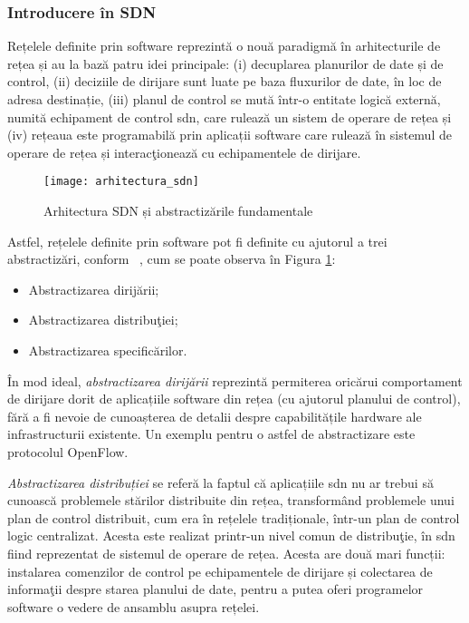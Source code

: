 \subsubsection{Introducere în SDN}

Rețelele definite prin software reprezintă o nouă paradigmă în arhitecturile de rețea și au la bază patru idei principale: (i) decuplarea planurilor de date și de control, (ii) deciziile de dirijare sunt luate pe baza fluxurilor de date, în loc de adresa destinație, (iii) planul de control se mută într-o entitate logică externă, numită echipament de control \gls{sdn}, care rulează un sistem de operare de rețea și (iv) rețeaua este programabilă prin aplicații software care rulează în sistemul de operare de rețea și interacţionează cu echipamentele de dirijare.

\begin{figure}[h]
	\centering
	\texttt{[image: arhitectura\_sdn]}
	\caption{Arhitectura SDN și abstractizările fundamentale~\cite{kreutz2015software}}
	\label{fig:arhitectura_sdn}
\end{figure}

Astfel, rețelele definite prin software pot fi definite cu ajutorul a trei abstractizări, conform ~\cite{kreutz2015software}, cum se poate observa în Figura \ref{fig:arhitectura_sdn}:
\begin{itemize}
	\item Abstractizarea dirijării;
	\item Abstractizarea distribuţiei;
	\item Abstractizarea specificărilor.	 
\end{itemize}

În mod ideal, \textit{abstractizarea dirijării} reprezintă permiterea oricărui comportament de dirijare dorit de aplicațiile software din rețea (cu ajutorul planului de control),  fără a fi nevoie de cunoașterea de detalii despre capabilitățile hardware ale infrastructurii existente. Un exemplu pentru o astfel de abstractizare este protocolul OpenFlow.

\textit{Abstractizarea distribuției} se referă la faptul că aplicațiile \gls{sdn} nu ar trebui să cunoască problemele stărilor distribuite din rețea, transformând problemele unui plan de control distribuit, cum era în rețelele tradiționale, într-un plan de control logic centralizat. Acesta este realizat printr-un nivel comun de distribuţie, în \gls{sdn} fiind reprezentat de sistemul de operare de rețea. Acesta are două mari funcții: instalarea comenzilor de control pe echipamentele de dirijare și colectarea de informaţii despre starea planului de date, pentru a putea oferi programelor software o vedere de ansamblu asupra rețelei.

